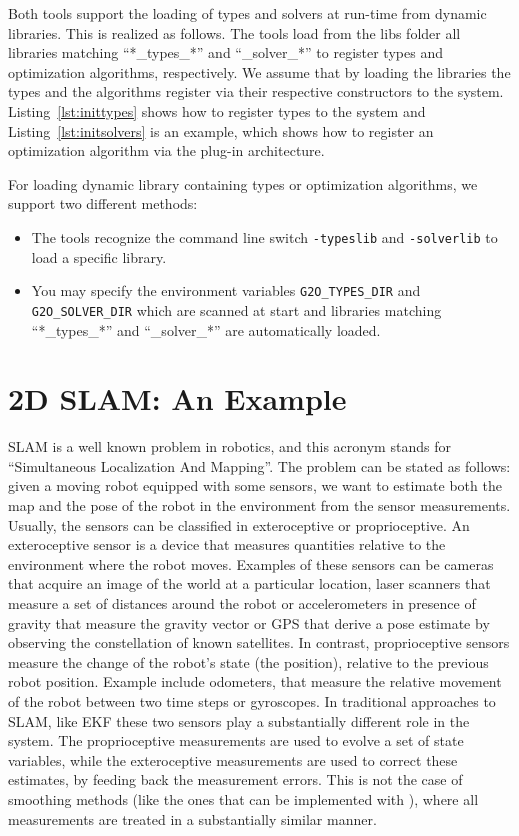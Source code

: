 \documentclass[a4paper]{article}
\begin{document}
Both tools support the loading of types and solvers at run-time from
dynamic libraries. This is realized as follows. The tools load from the
libs folder all libraries matching ``*\_types\_*'' and ``\_solver\_*''
to register types and optimization algorithms, respectively. We assume
that by loading the libraries the types and the algorithms register via
their respective constructors to the system. Listing~\ref{lst:inittypes}
shows how to register types to the system and
Listing~\ref{lst:initsolvers} is an example, which shows how to register
an optimization algorithm via the plug-in architecture.

For loading dynamic library containing types or optimization algorithms, we support two
different methods:
\begin{itemize}
  \item The tools recognize the command line switch \verb+-typeslib+
    and \verb+-solverlib+ to load a specific library.
  \item You may specify the environment variables \verb+G2O_TYPES_DIR+
    and \verb+G2O_SOLVER_DIR+ which are scanned at start and libraries
    matching ``*\_types\_*'' and ``\_solver\_*'' are automatically
    loaded.
\end{itemize}

\section{2D SLAM: An Example}
SLAM is a well known problem in robotics, and this acronym stands for
``Simultaneous Localization And Mapping''. The problem can be stated
as follows: given a moving robot equipped with some sensors, we want
to estimate both the map and the pose of the robot in the environment
from the sensor measurements. Usually, the sensors can be classified
in exteroceptive or proprioceptive.  An exteroceptive sensor is a
device that measures quantities relative to the environment where the
robot moves.  Examples of these sensors can be cameras that acquire an
image of the world at a particular location, laser scanners that
measure a set of distances around the robot or accelerometers in
presence of gravity that measure the gravity vector or GPS that derive
a pose estimate by observing the constellation of known satellites.
In contrast, proprioceptive sensors measure the change of the robot's
state (the position), relative to the previous robot position. Example
include odometers, that measure the relative movement of the robot
between two time steps or gyroscopes. In traditional approaches to
SLAM, like EKF these two sensors play a substantially different role
in the system.  The proprioceptive measurements are used to evolve a
set of state variables, while the exteroceptive measurements are used
to correct these estimates, by feeding back the measurement errors.
This is not the case of smoothing methods (like the ones that can be
implemented with \gopt{}), where all measurements are treated in a
substantially similar manner.
\end{document}
